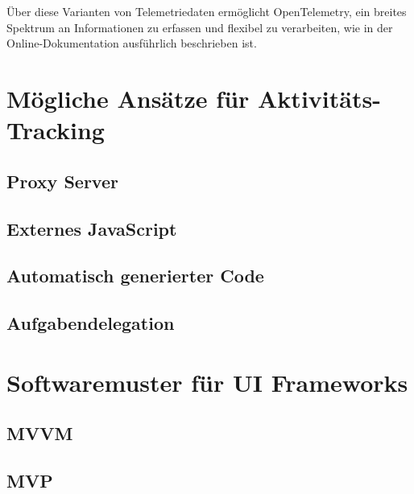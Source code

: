 Über diese Varianten von Telemetriedaten ermöglicht OpenTelemetry, ein breites Spektrum an Informationen zu erfassen und flexibel zu verarbeiten, wie in der Online-Dokumentation \cite{opentelemetry_what_is} ausführlich beschrieben ist.

\section{Mögliche Ansätze für Aktivitäts-Tracking}
\label{sec:solutions_tracking}

\subsection{Proxy Server}
\label{subsec:proxy_server}

\subsection{Externes JavaScript}
\label{subsec:external_js}

\subsection{Automatisch generierter Code}
\label{subsec:autogenerated_code}

\subsection{Aufgabendelegation}
\label{subsec:task_delegation}

\section{Softwaremuster für UI Frameworks}
\label{subsec:patterns}

\subsection{MVVM}
\label{subsec:mvvm}

\subsection{MVP}
\label{subsec:mvp}







